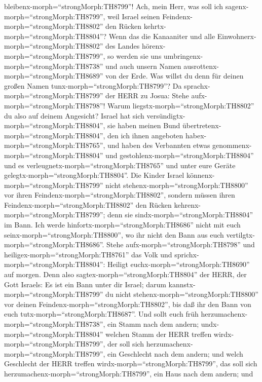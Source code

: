 bleibenx-morph=``strongMorph:TH8799''!  Ach, mein Herr, was
soll ich sagenx-morph=``strongMorph:TH8799'', weil Israel seinen
Feindenx-morph=``strongMorph:TH8802'' den Rücken
kehrtx-morph=``strongMorph:TH8804''?  Wenn das die
Kanaaniter und alle Einwohnerx-morph=``strongMorph:TH8802'' des Landes
hörenx-morph=``strongMorph:TH8799'', so werden sie uns
umbringenx-morph=``strongMorph:TH8738'' und auch unsern Namen
ausrottenx-morph=``strongMorph:TH8689'' von der Erde. Was willst du denn
für deinen großen Namen tunx-morph=``strongMorph:TH8799''? 
Da sprachx-morph=``strongMorph:TH8799'' der HERR zu Josua: Stehe
aufx-morph=``strongMorph:TH8798''! Warum
liegstx-morph=``strongMorph:TH8802'' du also auf deinem Angesicht?
 Israel hat sich versündigtx-morph=``strongMorph:TH8804'',
sie haben meinen Bund übertretenx-morph=``strongMorph:TH8804'', den ich
ihnen angeboten habex-morph=``strongMorph:TH8765'', und haben des
Verbannten etwas genommenx-morph=``strongMorph:TH8804'' und
gestohlenx-morph=``strongMorph:TH8804'' und es
verleugnetx-morph=``strongMorph:TH8765'' und unter eure Geräte
gelegtx-morph=``strongMorph:TH8804''.  Die Kinder Israel
könnenx-morph=``strongMorph:TH8799'' nicht
stehenx-morph=``strongMorph:TH8800'' vor ihren
Feindenx-morph=``strongMorph:TH8802'', sondern müssen ihren
Feindenx-morph=``strongMorph:TH8802'' den Rücken
kehrenx-morph=``strongMorph:TH8799''; denn sie
sindx-morph=``strongMorph:TH8804'' im Bann. Ich werde
hinfortx-morph=``strongMorph:TH8686'' nicht mit euch
seinx-morph=``strongMorph:TH8800'', wo ihr nicht den Bann aus euch
vertilgtx-morph=``strongMorph:TH8686''.  Stehe
aufx-morph=``strongMorph:TH8798'' und
heiligex-morph=``strongMorph:TH8761'' das Volk und
sprichx-morph=``strongMorph:TH8804'': Heiligt
euchx-morph=``strongMorph:TH8690'' auf morgen. Denn also
sagtex-morph=``strongMorph:TH8804'' der HERR, der Gott Israels: Es ist
ein Bann unter dir Israel; darum kannstx-morph=``strongMorph:TH8799'' du
nicht stehenx-morph=``strongMorph:TH8800'' vor deinen
Feindenx-morph=``strongMorph:TH8802'', bis daß ihr den Bann von euch
tutx-morph=``strongMorph:TH8687''.  Und sollt euch früh
herzumachenx-morph=``strongMorph:TH8738'', ein Stamm nach dem andern;
undx-morph=``strongMorph:TH8804'' welchen Stamm der HERR treffen
wirdx-morph=``strongMorph:TH8799'', der soll sich
herzumachenx-morph=``strongMorph:TH8799'', ein Geschlecht nach dem
andern; und welch Geschlecht der HERR treffen
wirdx-morph=``strongMorph:TH8799'', das soll sich
herzumachenx-morph=``strongMorph:TH8799'', ein Haus nach dem andern; und

